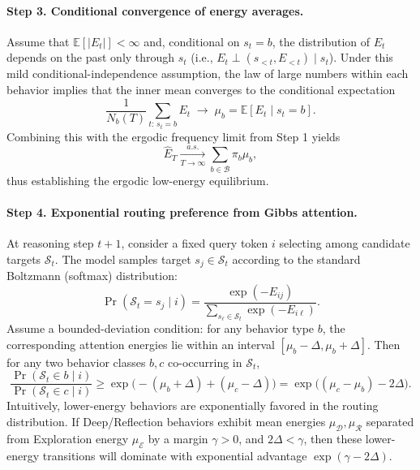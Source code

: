\paragraph{Step 3. Conditional convergence of energy averages.}  
Assume that \(\mathbb E[|E_t|] < \infty\) and, conditional on \(s_t=b\), the distribution of \(E_t\) depends on the past only through \(s_t\) (i.e., \(E_t \perp (s_{<t}, E_{<t}) \mid s_t\)). Under this mild conditional-independence assumption, the law of large numbers within each behavior implies that the inner mean converges to the conditional expectation
\begin{equation}
\frac{1}{N_b(T)} \sum_{t:\,s_t=b} E_t \;\to\; \mu_b
=\mathbb E[E_t\mid s_t=b].
\end{equation}
Combining this with the ergodic frequency limit from Step 1 yields
\begin{equation}
\widehat{E}_T \xrightarrow[T\to\infty]{a.s.} \sum_{b\in\mathcal B}\pi_b \mu_b, 
\end{equation}
thus establishing the ergodic low-energy equilibrium.\vspace{-5pt}

\paragraph{Step 4. Exponential routing preference from Gibbs attention.} 
At reasoning step \(t+1\), consider a fixed query token \(i\) selecting among candidate targets \(\mathcal S_t\). The model samples target \(s_j\in\mathcal S_t\) according to the standard Boltzmann (softmax) distribution:
\begin{equation}
\Pr(\mathcal S_t=s_j\mid i)
=\frac{\exp(-E_{ij})}{\sum_{s_{\ell}\in\mathcal S_t}\exp(-E_{i\ell})}. 
\end{equation}
Assume a bounded-deviation condition: for any behavior type \(b\), the corresponding attention energies lie within an interval \([\mu_b-\Delta, \mu_b+\Delta]\). Then for any two behavior classes \(b,c\) co-occurring in \(\mathcal S_t\),
\begin{equation}
\frac{\Pr(\mathcal S_t \in  b\mid i)}{\Pr(\mathcal S_t \in  c\mid i)}
\ge \exp \bigl(-(\mu_b+\Delta)+(\mu_c-\Delta)\bigr)
=\exp \bigl((\mu_c-\mu_b)-2\Delta\bigr). 
\end{equation}
Intuitively, lower-energy behaviors are exponentially favored in the routing distribution. If Deep/Reflection behaviors exhibit mean energies \(\mu_{\mathcal D},\mu_{\mathcal R}\) separated from Exploration energy \(\mu_{\mathcal E}\) by a margin \(\gamma>0\), and \(2\Delta<\gamma\), then these lower-energy transitions will dominate with exponential advantage \(\exp(\gamma-2\Delta)\).

